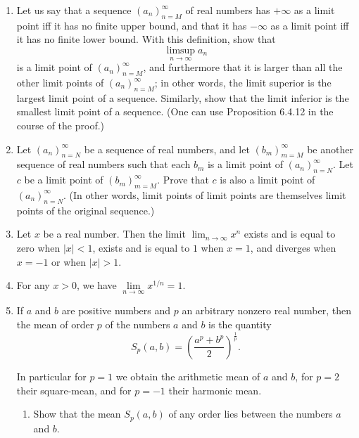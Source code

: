 \documentclass{article}
\theoremstyle{remark}
\begin{document}
\begin{enumerate}
        \item Let us say that a sequence \( (a_n)_{n=M}^{\infty} \) of real numbers has \( +\infty \) as a limit point iff it has no finite upper bound, and that it has \( -\infty \) as a limit point iff it has no finite lower bound. With this definition, show that
        \[
        \limsup_{n \to \infty} a_n
        \]
        is a limit point of \( (a_n)_{n=M}^{\infty} \), and furthermore that it is larger than all the other limit points of \( (a_n)_{n=M}^{\infty} \); in other words, the limit superior is the largest limit point of a sequence. 
        Similarly, show that the limit inferior is the smallest limit point of a sequence. (One can use Proposition 6.4.12 in the course of the proof.)

        \item Let \( (a_n)_{n=N}^{\infty} \) be a sequence of real numbers, and let \( (b_m)_{m=M}^{\infty} \) 
        be another sequence of real numbers such that each \( b_m \) is a limit point 
        of \( (a_n)_{n=N}^{\infty} \). 
        Let \( c \) be a limit point of \( (b_m)_{m=M}^{\infty} \). Prove that \( c \) is also a limit point of \( (a_n)_{n=N}^{\infty} \). 
        (In other words, limit points of limit points are themselves limit points of the original sequence.)

        \item Let \( x \) be a real number. 
        Then the limit \(\lim_{n \to \infty} x^n\) exists and is equal to zero when \(|x| < 1\), 
        exists and is equal to \(1\) when \(x = 1\), and diverges when \(x = -1\) or when \(|x| > 1\).

        \item For any \( x > 0 \), we have \(\lim\limits_{n \to \infty} x^{1/n} = 1\).

        \item If \( a \) and \( b \) are positive numbers and \( p \) an arbitrary nonzero real number, then the mean of order \( p \) of the numbers \( a \) and \( b \) is the quantity  
        \[
        S_p(a, b) = \left( \frac{a^p + b^p}{2} \right)^{\frac{1}{p}}.
        \]
        
        In particular for \( p = 1 \) we obtain the arithmetic mean of \( a \) and \( b \), for \( p = 2 \) their square-mean, and for \( p = -1 \) their harmonic mean.
        
        \begin{enumerate}
            \item[(a)] Show that the mean \( S_p(a, b) \) of any order lies between the numbers \( a \) and \( b \).
            

\end{enumerate}
\end{enumerate}
\end{document}
